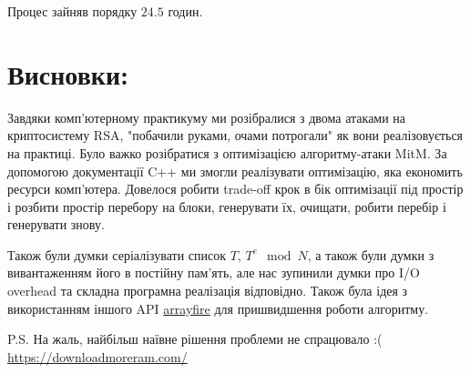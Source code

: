 Процес зайняв порядку $24.5$ годин. 

\section{Висновки:}
Завдяки комп'ютерному практикуму ми розібралися з двома атаками на криптосистему RSA, "побачили руками, очами потрогали"{} 
як вони реалізовується на практиці. Було важко розібратися з оптимізацією алгоритму-атаки MitM. За допомогою документації 
C++ ми змогли реалізувати оптимізацію, яка економить ресурси комп'ютера. Довелося робити trade-off крок в бік оптимізації 
під простір і розбити простір перебору на блоки, генерувати їх, очищати, робити перебір і генерувати знову.

Також були думки серіалізувати список $T$, $T^{e} \mod N$, а також були думки з вивантаженням його в постійну пам'ять, 
але нас зупинили думки про I/O overhead та складна програмна реалізація відповідно. Також була ідея з використанням 
іншого API \href{https://arrayfire.org/docs/gettingstarted.htm}{arrayfire} для пришвидшення роботи алгоритму. 

\noindent P.S. На жаль, найбільш наївне рішення проблеми не спрацювало :( \\
\url{https://downloadmoreram.com/}

